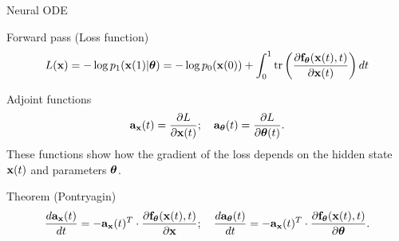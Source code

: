 \documentclass{beamer}
\begin{document}
\begin{frame}{Neural ODE}
	\begin{block}{Forward pass (Loss function)}
		\vspace{-0.3cm}
		\[
			L(\mathbf{x}) = - \log p_1(\mathbf{x}(1) | \boldsymbol{\theta}) = - \log p_0(\mathbf{x}(0)) + \int_{0}^{1} \text{tr} \left( \frac{\partial \mathbf{f}_{\boldsymbol{\theta}}(\mathbf{x}(t), t)}{\partial \mathbf{x}(t)} \right) dt
		\]
	\end{block}
	\vspace{-0.5cm}
	\begin{block}{Adjoint functions}
		\vspace{-0.3cm}
		\[
			\mathbf{a}_{\mathbf{x}}(t) = \frac{\partial L}{\partial \mathbf{x}(t)}; \quad \mathbf{a}_{\boldsymbol{\theta}}(t) = \frac{\partial L}{\partial \boldsymbol{\theta}(t)}.
		\]
		These functions show how the gradient of the loss depends on the hidden state~$\mathbf{x}(t)$ and parameters $\boldsymbol{\theta}$.
		\vspace{-0.3cm}
	\end{block}
	\begin{block}{Theorem (Pontryagin)}
		\vspace{-0.6cm}
		\[
		\frac{d \mathbf{a}_{\mathbf{x}}(t)}{dt} = - \mathbf{a}_{\mathbf{x}}(t)^T \cdot \frac{\partial \mathbf{f}_{\boldsymbol{\theta}}(\mathbf{x}(t), t)}{\partial \mathbf{x}}; \quad \frac{d \mathbf{a}_{\boldsymbol{\theta}}(t)}{dt} = - \mathbf{a}_{\mathbf{x}}(t)^T \cdot \frac{\partial \mathbf{f}_{\boldsymbol{\theta}}(\mathbf{x}(t),  t)}{\partial \boldsymbol{\theta}}.
		\]
		\vspace{-0.7cm}
	\end{block}
\end{frame}
\end{document}
